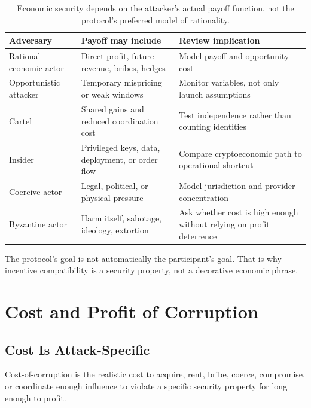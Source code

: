 \begin{table}[htbp]
\centering
\small
\renewcommand{\arraystretch}{1.16}
\begin{tabularx}{\textwidth}{@{}>{\RaggedRight\arraybackslash}p{}>{\RaggedRight\arraybackslash}p{}X@{}}
\toprule
Adversary & Payoff may include & Review implication \\
\midrule
Rational economic actor & Direct profit, future revenue, bribes, hedges & Model payoff and opportunity cost \\
Opportunistic attacker & Temporary mispricing or weak windows & Monitor variables, not only launch assumptions \\
Cartel & Shared gains and reduced coordination cost & Test independence rather than counting identities \\
Insider & Privileged keys, data, deployment, or order flow & Compare cryptoeconomic path to operational shortcut \\
Coercive actor & Legal, political, or physical pressure & Model jurisdiction and provider concentration \\
Byzantine actor & Harm itself, sabotage, ideology, extortion & Ask whether cost is high enough without relying on profit deterrence \\
\bottomrule
\end{tabularx}
\caption{Economic security depends on the attacker's actual payoff function, not the protocol's preferred model of rationality.}
\end{table}

The protocol's goal is not automatically the participant's goal. That is why incentive compatibility is a security property, not a decorative economic phrase.

\section{Cost and Profit of Corruption}

\subsection{Cost Is Attack-Specific}

Cost-of-corruption is the realistic cost to acquire, rent, bribe, coerce, compromise, or coordinate enough influence to violate a specific security property for long enough to profit.

